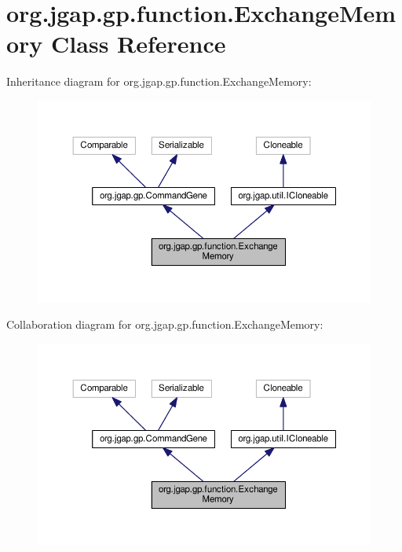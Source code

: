 \hypertarget{classorg_1_1jgap_1_1gp_1_1function_1_1_exchange_memory}{\section{org.\-jgap.\-gp.\-function.\-Exchange\-Memory Class Reference}
\label{classorg_1_1jgap_1_1gp_1_1function_1_1_exchange_memory}
}


Inheritance diagram for org.\-jgap.\-gp.\-function.\-Exchange\-Memory\-:
\nopagebreak
\begin{figure}[H]
\begin{center}
\leavevmode
\includegraphics[width=350pt]{classorg_1_1jgap_1_1gp_1_1function_1_1_exchange_memory__inherit__graph}
\end{center}
\end{figure}


Collaboration diagram for org.\-jgap.\-gp.\-function.\-Exchange\-Memory\-:
\nopagebreak
\begin{figure}[H]
\begin{center}
\leavevmode
\includegraphics[width=350pt]{classorg_1_1jgap_1_1gp_1_1function_1_1_exchange_memory__coll__graph}
\end{center}
\end{figure}
